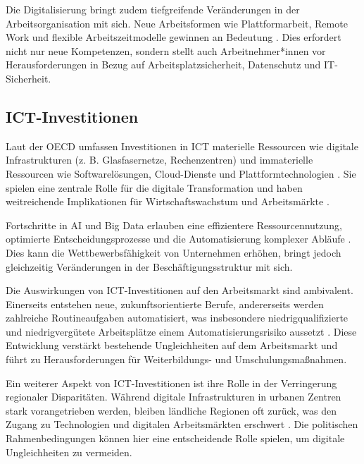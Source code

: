 Die Digitalisierung bringt zudem tiefgreifende Veränderungen in der Arbeitsorganisation mit sich. 
Neue Arbeitsformen wie Plattformarbeit, Remote Work und flexible Arbeitszeitmodelle gewinnen an 
Bedeutung \parencite[vgl.][S. 58–60]{schwab2016thefourth}. Dies erfordert nicht nur neue 
Kompetenzen, sondern stellt auch Arbeitnehmer*innen vor Herausforderungen in Bezug auf 
Arbeitsplatzsicherheit, Datenschutz und \ac{IT}-Sicherheit. 


\subsection{ICT-Investitionen}

Laut der OECD umfassen Investitionen in \ac{ICT} materielle Ressourcen wie digitale 
Infrastrukturen (z. B. Glasfasernetze, Rechenzentren) und immaterielle Ressourcen wie 
Softwarelösungen, Cloud-Dienste und Plattformtechnologien \parencite{oecd2022ict}. Sie spielen 
eine zentrale Rolle für die digitale Transformation und haben weitreichende Implikationen für 
Wirtschaftswachstum und Arbeitsmärkte \parencite[vgl.][S. 50]{oecd2019measuring}. 

Fortschritte in \ac{AI} und Big Data erlauben eine effizientere Ressourcennutzung, optimierte 
Entscheidungsprozesse und die Automatisierung komplexer Abläufe 
\parencite[vgl.][S. 120]{oecd2019measuring}. Dies kann die Wettbewerbsfähigkeit von Unternehmen 
erhöhen, bringt jedoch gleichzeitig Veränderungen in der Beschäftigungsstruktur mit sich. 

Die Auswirkungen von \ac{ICT}-Investitionen auf den Arbeitsmarkt sind ambivalent. Einerseits 
entstehen neue, zukunftsorientierte Berufe, andererseits werden zahlreiche Routineaufgaben 
automatisiert, was insbesondere niedrigqualifizierte und  niedrigvergütete Arbeitsplätze einem 
Automatisierungsrisiko aussetzt \parencite[vgl.][S. 42]{frey2013thefuture}. Diese Entwicklung 
verstärkt bestehende Ungleichheiten auf dem Arbeitsmarkt und führt zu Herausforderungen für 
Weiterbildungs- und Umschulungsmaßnahmen. 

Ein weiterer Aspekt von \ac{ICT}-Investitionen ist ihre Rolle in der Verringerung regionaler 
Disparitäten. Während digitale Infrastrukturen in urbanen Zentren stark vorangetrieben werden, 
bleiben ländliche Regionen oft zurück, was den Zugang zu Technologien und digitalen 
Arbeitsmärkten erschwert \parencite[vgl.][S. 106]{oecd2019measuring}. Die politischen 
Rahmenbedingungen können hier eine entscheidende Rolle spielen, um digitale Ungleichheiten zu 
vermeiden. 

